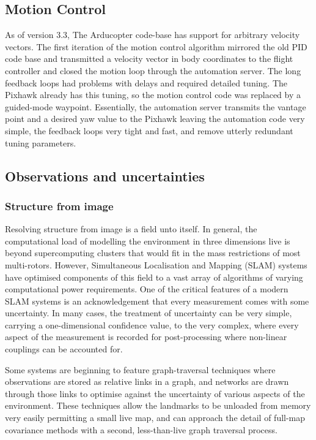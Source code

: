 \documentclass[a4paper, 11pt, titlepage]{article}
\begin{document}
  \subsection{Motion Control}
    As of version 3.3, The Arducopter code-base has support for arbitrary velocity vectors.  The first iteration of the motion control algorithm mirrored the old PID code base and transmitted a velocity vector in body coordinates to the flight controller and closed the motion loop through the automation server.  The long feedback loops had problems with delays and required detailed tuning.  The Pixhawk already has this tuning, so the motion control code was replaced by a guided-mode waypoint.  Essentially, the automation server transmits the vantage point and a desired yaw value to the Pixhawk leaving the automation code very simple, the feedback loops very tight and fast, and remove utterly redundant tuning parameters.

  \subsection{Observations and uncertainties}
    \subsubsection{Structure from image}
      Resolving structure from image is a field unto itself.  In general, the computational load of modelling the environment in three dimensions live is beyond supercomputing clusters that would fit in the mass restrictions of most multi-rotors.  However, Simultaneous Localisation and Mapping (SLAM) systems have optimised components of this field to a vast array of algorithms of varying computational power requirements.
      One of the critical features of a modern SLAM systems is an acknowledgement that every measurement comes with some uncertainty. 
      In many cases, the treatment of uncertainty can be very simple, carrying a one-dimensional confidence value, to the very complex, where every aspect of the measurement is recorded for post-processing where non-linear couplings can be accounted for.

      Some systems are beginning to feature graph-traversal techniques where observations are stored as relative links in a graph, and networks are drawn through those links to optimise against the uncertainty of various aspects of the environment.  These techniques allow the landmarks to be unloaded from memory very easily permitting a small live map, and can approach the detail of full-map covariance methods with a second, less-than-live graph traversal process.
\end{document}
